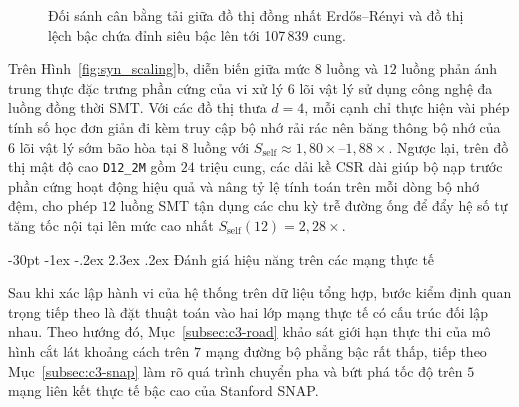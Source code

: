 \documentclass[12pt,a4paper,openany,oneside]{report}
\makeatletter
\theoremstyle{plain}
\renewcommand\section{\@startsection {section}{1}{\z@}
    {-30pt \@plus -1ex \@minus -.2ex}
    {2.3ex \@plus.2ex}
    {\normalfont\large\bfseries}}
\numberwithin{equation}{section}
\makeatother
\begin{document}
\begin{figure}[!htb]
{%
}
\caption{Đối sánh cân bằng tải giữa đồ thị đồng nhất Erd\H{o}s--R\'{e}nyi và đồ thị lệch bậc chứa đỉnh siêu bậc lên tới 107\,839 cung.}
\label{fig:tikz_hub_balance}
\end{figure}

Trên Hình~\ref{fig:syn_scaling}b, diễn biến giữa mức $8$ luồng và $12$ luồng phản ánh trung thực đặc trưng phần cứng của vi xử lý $6$ lõi vật lý sử dụng công nghệ đa luồng đồng thời SMT. Với các đồ thị thưa $d = 4$, mỗi cạnh chỉ thực hiện vài phép tính số học đơn giản đi kèm truy cập bộ nhớ rải rác nên băng thông bộ nhớ của $6$ lõi vật lý sớm bão hòa tại $8$ luồng với $S_{\mathrm{self}} \approx 1{,}80\times$--$1{,}88\times$. Ngược lại, trên đồ thị mật độ cao \texttt{D12\_2M} gồm $24$ triệu cung, các dải kề CSR dài giúp bộ nạp trước phần cứng hoạt động hiệu quả và nâng tỷ lệ tính toán trên mỗi dòng bộ nhớ đệm, cho phép $12$ luồng SMT tận dụng các chu kỳ trễ đường ống để đẩy hệ số tự tăng tốc nội tại lên mức cao nhất $S_{\mathrm{self}}(12) = 2{,}28\times$.

\section{Đánh giá hiệu năng trên các mạng thực tế}\label{sec:c3-realworld}

Sau khi xác lập hành vi của hệ thống trên dữ liệu tổng hợp, bước kiểm định quan trọng tiếp theo là đặt thuật toán vào hai lớp mạng thực tế có cấu trúc đối lập nhau. Theo hướng đó, Mục~\ref{subsec:c3-road} khảo sát giới hạn thực thi của mô hình cắt lát khoảng cách trên $7$ mạng đường bộ phẳng bậc rất thấp, tiếp theo Mục~\ref{subsec:c3-snap} làm rõ quá trình chuyển pha và bứt phá tốc độ trên $5$ mạng liên kết thực tế bậc cao của Stanford SNAP.
\end{document}
